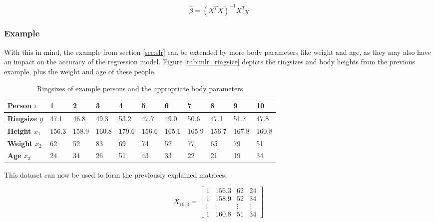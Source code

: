 \begin{equation}
\label{eq:mlr}
    \hat{\beta} = (X^TX)^{-1} X^Ty
\end{equation}

\subsubsection{Example}

With this in mind, the example from section \vref{sec:slr} can be extended by more body parameters like weight and age, as they may also have an impact on the accuracy of the regression model. Figure \vref{tab:mlr_ringsize} depicts the ringsizes and body heights from the previous example, plus the weight and age of these people.

\begin{table}[H]
    \centering
    \begin{tabular}{|l|l|l|l|l|l|l|l|l|l|l|}
    \hline
    \textbf{Person $ i $}    & \textbf{1} & \textbf{2} & \textbf{3} & \textbf{4} & \textbf{5} & \textbf{6} & \textbf{7} & \textbf{8} & \textbf{9} & \textbf{10} \\ \hline
    \textbf{Ringsize $ y $}  & 47.1       & 46.8       & 49.3       & 53.2       & 47.7       & 49.0       & 50.6       & 47.1       & 51.7       & 47.8        \\ \hline
    \textbf{Height $ x_1 $}  & 156.3      & 158.9      & 160.8      & 179.6      & 156.6      & 165.1      & 165.9      & 156.7      & 167.8      & 160.8       \\ \hline
    \textbf{Weight $ x_2 $}  & 62         & 52         & 83         & 69         & 74         & 52         & 77         & 65         & 79         & 51          \\ \hline
    \textbf{Age $ x_3 $}     & 24         & 34         & 26         & 51         & 43         & 33         & 22         & 21         & 19         & 34          \\ \hline
    \end{tabular}
    \caption{Ringsizes of example persons and the appropriate body parameters}
    \label{tab:mlr_ringsize}
\end{table}

This dataset can now be used to form the previously explained matrices.

\begin{equation}
    X_{10, 3} =
    \begin{bmatrix}
        1 & 156.3 & 62 & 24 \\
        1 & 158.9 & 52 & 34 \\
        \vdots & \vdots & \vdots & \vdots \\
        1 & 160.8 & 51 & 34
    \end{bmatrix}
\end{equation}

